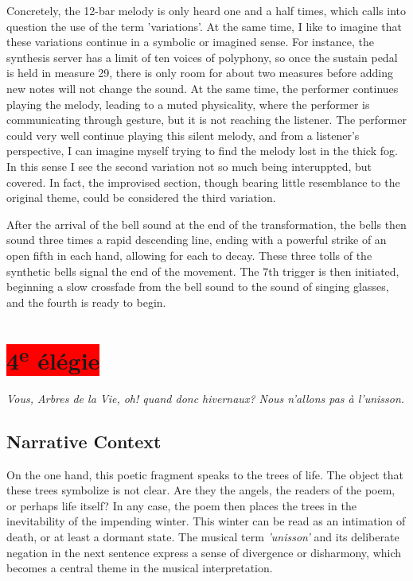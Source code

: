 \documentclass[12pt,twoside,maitrise]{dms_ks}
\theoremstyle{definition}
\begin{document}
{Concretely, the 12-bar melody is only heard one and a half times, which calls into question the use of the term 'variations'. 
At the same time, I like to imagine that these variations continue in a symbolic or imagined sense. 
For instance, the synthesis server has a limit of ten voices of polyphony, so once the sustain pedal is held in measure 29, there is only room for about two measures before adding new notes will not change the sound. 
At the same time, the performer continues playing the melody, leading to a muted physicality, where the performer is communicating through gesture, but it is not reaching the listener. 
The performer could very well continue playing this silent melody, and from a listener's perspective, I can imagine myself trying to find the melody lost in the thick fog. 
In this sense I see the second variation not so much being interuppted, but covered. 
In fact, the improvised section, though bearing little resemblance to the original theme, could be considered the third variation.

After the arrival of the bell sound at the end of the transformation, the bells then sound three times a rapid descending line, ending with a powerful strike of an open fifth in each hand, allowing for each to decay. 
These three tolls of the synthetic bells signal the end of the movement. 
The 7th trigger is then initiated, beginning a slow crossfade from the bell sound to the sound of singing glasses, and the fourth is ready to begin.


\section{\colorbox{red}{4\textsuperscript{e} élégie}}

\epigraph{\textit{Vous, Arbres de la Vie, oh! quand donc hivernaux? Nous n'allons pas à l'unisson.}}{}

\subsection{Narrative Context}

On the one hand, this poetic fragment speaks to the trees of life.
The object that these trees symbolize is not clear.
Are they the angels, the readers of the poem, or perhaps life itself?
In any case, the poem then places the trees in the inevitability of the impending winter.
This winter can be read as an intimation of death, or at least a dormant state.
The musical term \textit{'unisson'} and its deliberate negation in the next sentence express a sense of divergence or disharmony, which becomes a central theme in the musical interpretation.

}
\end{document}
